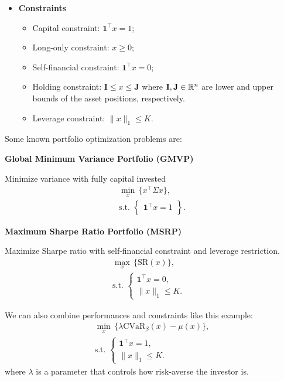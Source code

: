 \begin{itemize}
	\item \textbf{Constraints}
	      \begin{itemize}
		      \item Capital constraint: $\textbf{1}^\top x=1$;
		      \item Long-only constraint: $x\geq0$;
		      \item Self-financial constraint: $\textbf{1}^\top x=0$;
		      \item Holding constraint: $\mathbf{I}\leq x\leq \mathbf{J}$ where $\mathbf{I},\mathbf{J}\in\mathbb{R}^n$ are lower and upper bounds of the asset positions, respectively.
		      \item Leverage constraint: $\|x\|_1\leq K$.
	      \end{itemize}
\end{itemize}

Some known portfolio optimization problems are:

\noindent\textbf{Global Minimum Variance Portfolio (GMVP)}

Minimize variance with fully capital invested
\begin{eqnarray}\label{prob:GMVP}
	\min_{x} \,\big\{x^\top \Sigma x\big\}, \\
	\mbox{s.t. }\left\{
	\begin{aligned}\nonumber
		\mathbf{1}^\top x=1 \\
	\end{aligned}
	\right\}.
\end{eqnarray}

\noindent\textbf{Maximum Sharpe Ratio Portfolio (MSRP)}

Maximize Sharpe ratio with self-financial constraint and leverage restriction.
\begin{eqnarray}\label{prob:MSRP}
	\max_{x} \,\big\{\mbox{SR}(x)\big\}, \\
	\mbox{s.t. }\left\{
	\begin{aligned}\nonumber
		\mathbf{1}^\top x=0, & \\
		\|x\|_1\leq K.
	\end{aligned}
	\right.
\end{eqnarray}

We can also combine performances and constraints like this example:
\begin{eqnarray}\label{prob:General}
	\min_{x} \,\big\{\lambda \mbox{CVaR}_\beta(x) - \mu(x)\big\}, \\
	\mbox{s.t. }\left\{
	\begin{aligned}\nonumber
		\mathbf{1}^\top x=1, & \\
		\|x\|_1\leq K.
	\end{aligned}
	\right.
\end{eqnarray}
where $\lambda$ is a parameter that controls how risk-averse the investor is. 

